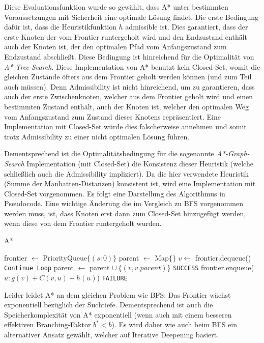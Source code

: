 \documentclass{whswinvcbook}
\begin{document}
Diese Evaluationsfunktion wurde so gewählt, dass A* unter bestimmten Voraussetzungen mit Sicherheit eine optimale Lösung findet. Die erste Bedingung dafür ist, dass die Heuristikfunktion $h$ admissible ist.\cite{ai} Dies garantiert, dass der erste Knoten der vom Frontier runtergeholt wird und den Endzustand enthält auch der Knoten ist, der den optimalen Pfad vom Anfangszustand zum Endzustand abschließt. Diese Bedingung ist hinreichend für die Optimalität von \textit{A*-Tree-Search}. Diese Implementation von A* benutzt kein Closed-Set, womit die gleichen Zustände öfters aus dem Frontier geholt werden können (und zum Teil auch müssen). Denn Admissibility ist nicht hinreichend, um zu garantieren, dass auch der erste Zwischenknoten, welcher aus dem Frontier geholt wird und einen bestimmten Zustand enthält, auch der Knoten ist, welcher den optimalen Weg vom Anfangszustand zum Zustand dieses Knotens repräsentiert. Eine Implementation mit Closed-Set würde dies falscherweise annehmen und somit trotz Admissibility zu einer nicht optimalen Lösung führen.

Dementsprechend ist die Optimalitätsbedingung für die sogenannte \textit{A*-Graph-Search} Implementation (mit Closed-Set) die Konsistenz dieser Heuristik (welche schließlich auch die Admissibility impliziert).\cite{ai} Da die hier verwendete Heuristik (Summe der Manhatten-Distanzen) konsistent ist, wird eine Implementation mit Closed-Set vorgenommen. Es folgt eine Darstellung des Algorithmus in Pseudocode. Eine wichtige Änderung die im Vergleich zu BFS vorgenommen werden muss, ist, dass Knoten erst dann zum Closed-Set hinzugefügt werden, wenn diese von dem Frontier runtergeholt wurden.
\begin{algorithm}[H]
    \caption{A*}\label{alg-astar}
    \begin{algorithmic}[1]
            \State frontier $\gets$ PriorityQueue$\{(s:0)\}$
            \State parent $\gets$ Map$\{\}$
            \Repeat
                \State $v\gets$ frontier.dequeue()
                    \State \texttt{Continue Loop}
                \EndIf
                \State parent $\gets$ parent $\cup\:\{(v,v.parent)\}$
                    \State \Return \texttt{SUCCESS}
                \EndIf
                    \State frontier.enqueue($u:g(v)+C(v,u)+h(u)$)
                \EndFor
            \State \Return \texttt{FAILURE}
        \EndFunction
    \end{algorithmic}
\end{algorithm}
Leider leidet A* an dem gleichen Problem wie BFS: Das Frontier wächst exponentiell bezüglich der Suchtiefe. Dementsprechend ist auch die Speicherkomplexität von A* exponentiell (wenn auch mit einem besseren effektiven Branching-Faktor $b^*<b$). Es wird daher wie auch beim BFS ein alternativer Ansatz gewählt, welcher auf Iterative Deepening basiert.
\end{document}
